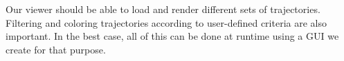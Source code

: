 Our viewer should be able to load and render different sets of trajectories. Filtering and coloring trajectories according to user-defined criteria are also important. In the best case, all of this can be done at runtime using a GUI we create for that purpose.



